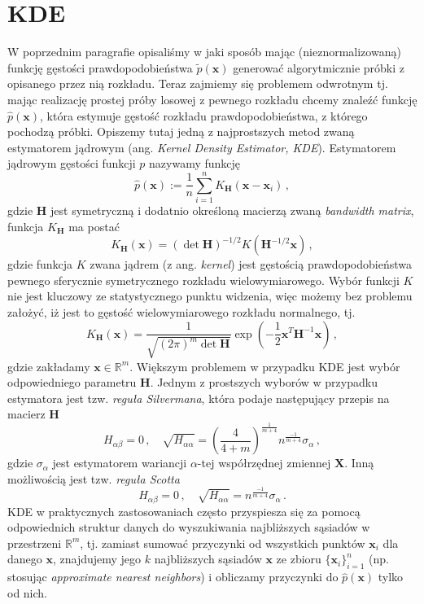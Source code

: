 \documentclass{myclass}
\begin{document}
\section{KDE}

W poprzednim paragrafie opisaliśmy w jaki sposób mając (nieznormalizowaną) funkcję gęstości
prawdopodobieństwa \(\tilde{p}(\bm{x})\) generować algorytmicznie próbki z opisanego przez nią
rozkładu. Teraz zajmiemy się problemem odwrotnym tj. mając realizację prostej próby losowej z
pewnego rozkładu chcemy znaleźć funkcję \(\hat{p}(\bm{x})\), która estymuje gęstość rozkładu
prawdopodobieństwa, z którego pochodzą próbki. Opiszemy tutaj jedną z najprostszych metod zwaną
estymatorem jądrowym (ang. \emph{Kernel Density Estimator, KDE}). Estymatorem jądrowym gęstości
funkcji \(p\) nazywamy funkcję
\[
\hat{p}(\bm{x}) := \frac{1}{n}\sum_{i=1}^n K_{\bm{H}}(\bm{x} - \bm{x}_i)\,,
\]
gdzie \(\bm{H}\) jest symetryczną i dodatnio określoną macierzą zwaną \textit{bandwidth matrix},
funkcja \(K_{\bm{H}}\) ma postać
\[
K_{\bm{H}}(\bm{x}) = (\det \bm{H})^{-1/2} K(\bm{H}^{-1/2}\bm{x})\,,
\]
gdzie funkcja \(K\) zwana jądrem (z ang. \textit{kernel}) jest gęstością prawdopodobieństwa pewnego
sferycznie symetrycznego rozkładu wielowymiarowego. Wybór funkcji \(K\) nie jest kluczowy ze
statystycznego punktu widzenia, więc możemy bez problemu założyć, iż jest to gęstość
wielowymiarowego rozkładu normalnego, tj.
\[
K_{\bm{H}}(\bm{x}) = \frac{1}{\sqrt{(2\pi)^m \det\bm{H}}} \exp\left(-\frac{1}{2} \bm{x}^T\bm{H}^{-1}\bm{x}\right)\,,
\]
gdzie zakładamy \(\bm{x} \in \mathbb{R}^m\). Większym problemem w przypadku KDE jest wybór
odpowiedniego parametru \(\bm{H}\). Jednym z prostszych wyborów w przypadku estymatora jest tzw.
\emph{reguła Silvermana}, która podaje następujący przepis na macierz \(\bm{H}\)
\[
H_{\alpha\beta} = 0\,,\quad \sqrt{H_{\alpha\alpha}} = \left(\frac{4}{4 + m}\right)^\frac{1}{m + 4} n^\frac{-1}{m + 4} \sigma_\alpha\,,
\] 
gdzie \(\sigma_\alpha\) jest estymatorem wariancji \(\alpha\)-tej współrzędnej zmiennej \(\bm{X}\).
Inną możliwością jest tzw. \emph{reguła Scotta}
\[
H_{\alpha\beta} = 0\,,\quad \sqrt{H_{\alpha\alpha}} = n^\frac{-1}{m+4} \sigma_\alpha\,.
\]
KDE w praktycznych zastosowaniach często przyspiesza się za pomocą odpowiednich struktur danych do
wyszukiwania najbliższych sąsiadów w przestrzeni \(\mathbb{R}^m\), tj. zamiast sumować przyczynki od
wszystkich punktów \(\bm{x}_i\) dla danego \(\bm{x}\), znajdujemy jego \(k\) najbliższych sąsiadów
\(\bm{x}\) ze zbioru \(\{\bm{x}_i\}_{i=1}^n\) (np. stosując \emph{approximate nearest neighbors}) i
obliczamy przyczynki do \(\hat{p}(\bm{x})\) tylko od nich.
\end{document}
